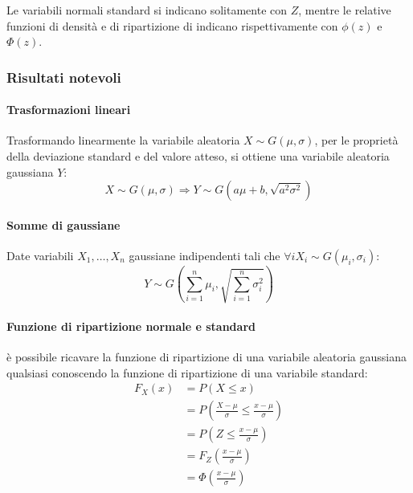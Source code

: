 Le variabili normali standard si indicano solitamente con $Z$, mentre le relative funzioni di densità e di ripartizione di indicano rispettivamente con $\phi(z)$ e $\Phi(z)$.


\subsubsection{Risultati notevoli}

\paragraph{Trasformazioni lineari} Trasformando linearmente la variabile aleatoria $X\sim G(\mu,\sigma)$, per le proprietà della deviazione standard e del valore atteso, si ottiene una variabile aleatoria gaussiana $Y$:
\begin{equation*}
	X\sim G(\mu,\sigma) \Rightarrow Y\sim G(a\mu+b,\sqrt{a^2\sigma^2})
\end{equation*}

\paragraph{Somme di gaussiane} Date variabili $X_1,\dots,X_n$ gaussiane indipendenti tali che $\forall i X_i\sim G(\mu_i,\sigma_i)$:
\begin{equation*}
	Y\sim G\left(\sum_{i=1}^n \mu_i,\sqrt{\sum_{i=1}^n \sigma_i^2}\right)
\end{equation*}

\paragraph{Funzione di ripartizione normale e standard} è possibile ricavare la funzione di ripartizione di una variabile aleatoria gaussiana qualsiasi conoscendo la funzione di ripartizione di una variabile standard:
\begin{align*}
	F_X(x) & = P(X\leq x)                                                 \\
	       & = P\left(\frac{X-\mu}{\sigma}\leq\frac{x-\mu}{\sigma}\right) \\
	       & = P\left(Z\leq \frac{x-\mu}{\sigma}\right)                   \\
	       & = F_Z\left(\frac{x-\mu}{\sigma}\right)                       \\
	       & = \Phi\left(\frac{x-\mu}{\sigma}\right)
\end{align*}


